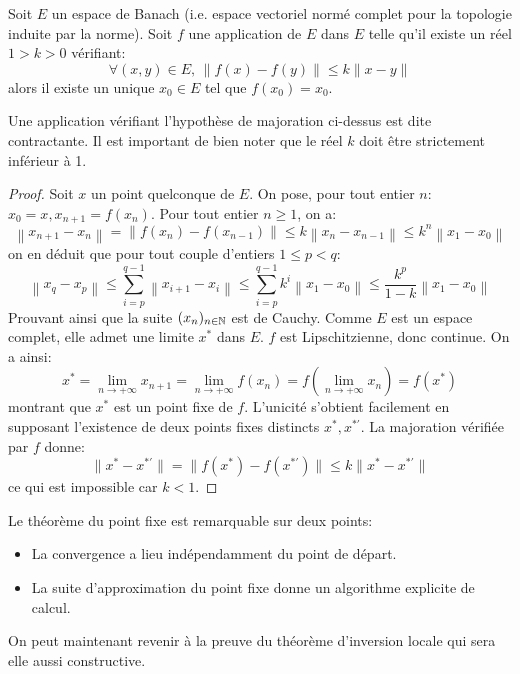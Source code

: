 \begin{fthm} \label{thm:pt_fixe}
Soit $E$ un espace de Banach (i.e. espace vectoriel normé complet pour la topologie induite par la norme). Soit $f$ une application de $E$ dans $E$ telle qu'il existe un réel $1 > k > 0$ vérifiant:
\[
\forall (x,y) \in E, \, \|f(x)-f(y)\| \leq k \|x-y\|
\]
alors il existe un unique $x_0 \in E$ tel que $f(x_0)=x_0$.
\end{fthm}
Une application vérifiant l'hypothèse de majoration ci-dessus est dite contractante. Il est important de bien noter que le réel $k$ doit être strictement inférieur à 1. 
\begin{proof}
Soit $x$ un point quelconque de $E$. On pose, pour tout entier $n$: $x_0 = x, x_{n+1}=f(x_n)$. Pour tout entier $n \geq 1$, on a:
\[
\left\| x_{n+1}-x_n \right \| = \left\| f(x_n)-f(x_{n-1}) \right \| \leq k \left\| x_n-x_{n-1} \right \|
\leq k^n \left\| x_1-x_0 \right \| 
\]
on en déduit que pour tout couple d'entiers $1 \leq p < q$:
\[
\left\| x_q - x_p \right \| \leq \sum_{i=p}^{q-1} \left\| x_{i+1} - x_i \right \| \leq \sum_{i=p}^{q-1} k^i \left\| x_1-x_0 \right \| \leq \frac{k^p}{1-k} \left\| x_1-x_0 \right \|
\]
Prouvant ainsi que la suite $(x_n)_{n \in {\mathbb N}}$ est de Cauchy. Comme $E$ est un espace complet, elle admet une limite $x^*$ dans $E$. $f$ est Lipschitzienne, donc continue. On a ainsi:
\[
x^* = \lim_{n \to +\infty } x_{n+1} = \lim_{n \to +\infty} f(x_n) = f\left( \lim_{n \to +\infty} x_n \right)
=f(x^*)
\]
montrant que $x^*$ est un point fixe de $f$. L'unicité s'obtient facilement en supposant l'existence de deux points fixes distincts $x^*, x^{*\prime}$. La majoration vérifiée par $f$ donne:
\[
\|x^* - x^{*\prime}\|= \|f(x^*) - f(x^{*\prime})\| \leq k \|x^* - x^{*\prime}\|
\] 
ce qui est impossible car $k < 1$.
\end{proof}
\begin{rem}
Le théorème du point fixe est remarquable sur deux points: 
\begin{itemize}
\item La convergence a lieu indépendamment du point de départ. 
\item La suite d'approximation du point fixe donne un algorithme explicite de calcul.
\end{itemize}
\end{rem}
On peut maintenant revenir à la preuve du théorème d'inversion locale qui sera elle aussi constructive.
